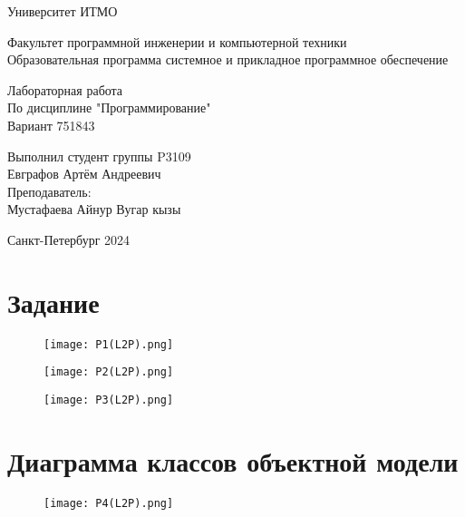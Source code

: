 

\thispagestyle{empty}
\begin{center}
\LARGE{Университет ИТМО} 
\vspace{20pt}

\LARGE{Факультет программной инженерии и компьютерной техники \\
Образовательная программа системное и прикладное программное обеспечение}
\vspace{160pt}

\LARGE{Лабораторная работа   \\
По дисциплине "Программирование" \\ 
Вариант 751843}
\vspace{120pt}
\end{center}

\begin{flushright}
\LARGE{Выполнил студент группы P3109 \\ 
Евграфов Артём Андреевич \\
Преподаватель: \\
Мустафаева Айнур Вугар кызы}
\vspace{120pt}
\end{flushright}

\begin{center}
\Large{Санкт-Петербург 2024}
\end{center}

\newpage
\setcounter{page}{1}
\tableofcontents
\newpage
\section{Задание}
\begin{figure}[H]
    \centering
    \texttt{[image: P1(L2P).png]}
    \label{fig:enter-label}
\end{figure}
\begin{figure}[H]
    \centering
    \texttt{[image: P2(L2P).png]}
    \label{fig:enter-label}
\end{figure}
\begin{figure}[H]
    \centering
    \texttt{[image: P3(L2P).png]}
    \label{fig:enter-label}
\end{figure}
\section{Диаграмма классов объектной модели}
\begin{figure}[H]
    \centering
    \texttt{[image: P4(L2P).png]}
    \label{fig:enter-label}
\end{figure}
